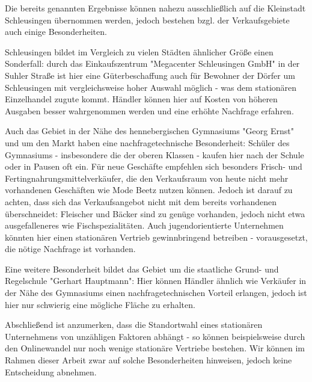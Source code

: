 Die bereits genannten Ergebnisse können nahezu ausschließlich auf die Kleinstadt Schleusingen übernommen werden, jedoch bestehen bzgl. der Verkaufsgebiete auch einige Besonderheiten.

Schleusingen bildet im Vergleich zu vielen Städten ähnlicher Größe einen Sonderfall: durch das Einkaufszentrum "Megacenter Schleusingen GmbH" in der Suhler Straße ist hier eine Güterbeschaffung auch für Bewohner der Dörfer um Schleusingen mit vergleichsweise hoher Auswahl möglich - was dem stationären Einzelhandel zugute kommt. Händler können hier auf Kosten von höheren Ausgaben besser wahrgenommen werden und eine erhöhte Nachfrage erfahren. 

Auch das Gebiet in der Nähe des hennebergischen Gymnasiums "Georg Ernst" und um den Markt haben eine nachfragetechnische Besonderheit: Schüler des Gymnasiums - insbesondere die der oberen Klassen - kaufen hier nach der Schule oder in Pausen oft ein. Für neue Geschäfte empfehlen sich besonders Frisch- und Fertingnahrungsmittelverkäufer, die den Verkaufsraum von heute nicht mehr vorhandenen Geschäften wie Mode Beetz nutzen können. Jedoch ist darauf zu achten, dass sich das Verkaufsangebot nicht mit dem bereits vorhandenen überschneidet: Fleischer und Bäcker sind zu genüge vorhanden, jedoch nicht etwa ausgefalleneres wie Fischspezialitäten. Auch jugendorientierte Unternehmen könnten hier einen stationären Vertrieb gewinnbringend betreiben - vorausgesetzt, die nötige Nachfrage ist vorhanden.

Eine weitere Besonderheit bildet das Gebiet um die staatliche Grund- und Regelschule "Gerhart Hauptmann": Hier können Händler ähnlich wie Verkäufer in der Nähe des Gymnasiums einen nachfragetechnischen Vorteil erlangen, jedoch ist hier nur schwierig eine mögliche Fläche zu erhalten.

Abschließend ist anzumerken, dass die Standortwahl eines stationären Unternehmens von unzähligen Faktoren abhängt - so können beispielsweise durch den Onlinewandel nur noch wenige stationäre Vertriebe bestehen. Wir können im Rahmen dieser Arbeit zwar auf solche Besonderheiten hinweisen, jedoch keine Entscheidung abnehmen. 


